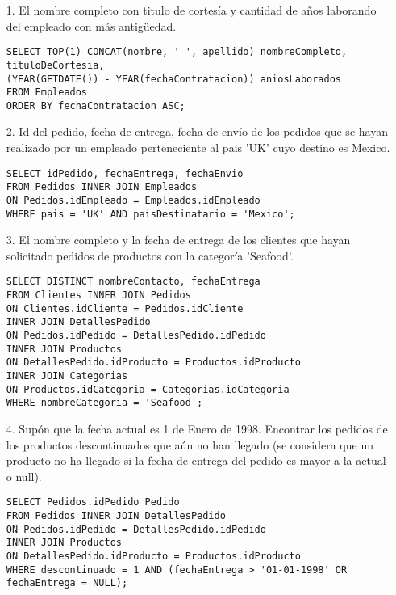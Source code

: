 \documentclass[12pt, letterpaper]{article}
\begin{document}
    \begin{itemize}
        \item[1.] El nombre completo con titulo de cortesía y cantidad de años laborando del 
                  empleado con más antigüedad.

                  \begin{lstlisting}
SELECT TOP(1) CONCAT(nombre, ' ', apellido) nombreCompleto, 
tituloDeCortesia, 
(YEAR(GETDATE()) - YEAR(fechaContratacion)) aniosLaborados
FROM Empleados
ORDER BY fechaContratacion ASC;
                  \end{lstlisting}

        \item[2.] Id del pedido, fecha de entrega, fecha de envío de los pedidos que
                  se hayan realizado por un empleado perteneciente al pais 'UK' cuyo
                  destino es Mexico.

                  \begin{lstlisting}
SELECT idPedido, fechaEntrega, fechaEnvio
FROM Pedidos INNER JOIN Empleados
ON Pedidos.idEmpleado = Empleados.idEmpleado
WHERE pais = 'UK' AND paisDestinatario = 'Mexico';
                  \end{lstlisting}

        \item[3.] El nombre completo y la fecha de entrega de los clientes que hayan
                  solicitado pedidos de productos con la categoría 'Seafood'.

                  \begin{lstlisting}
SELECT DISTINCT nombreContacto, fechaEntrega
FROM Clientes INNER JOIN Pedidos
ON Clientes.idCliente = Pedidos.idCliente
INNER JOIN DetallesPedido 
ON Pedidos.idPedido = DetallesPedido.idPedido
INNER JOIN Productos 
ON DetallesPedido.idProducto = Productos.idProducto
INNER JOIN Categorias 
ON Productos.idCategoria = Categorias.idCategoria
WHERE nombreCategoria = 'Seafood';
                  \end{lstlisting}

        \item[4.] Supón que la fecha actual es 1 de Enero de 1998. Encontrar los pedidos
                  de los productos descontinuados que aún no han llegado (se
                  considera que un producto no ha llegado si la fecha de entrega del
                  pedido es mayor a la actual o null).

                  \begin{lstlisting}
SELECT Pedidos.idPedido Pedido
FROM Pedidos INNER JOIN DetallesPedido
ON Pedidos.idPedido = DetallesPedido.idPedido
INNER JOIN Productos
ON DetallesPedido.idProducto = Productos.idProducto
WHERE descontinuado = 1 AND (fechaEntrega > '01-01-1998' OR fechaEntrega = NULL);
                  \end{lstlisting}


\end{itemize}
\end{document}
